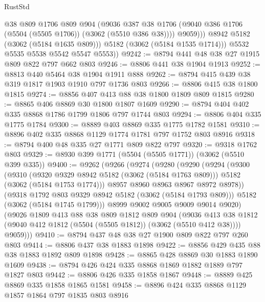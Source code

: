 \begin{lexlean}{RustStd}
\begin{coremodule}
                  @38
                  @809
                  @1706
                  @809
                  @904
                  (@9036
                    @387
                    @38
                    @1706
                    (@9040 @386 @1706 (@5504 (@5505 @1706)) (@3062 (@5510 @386 @38))))
                  @9059)))
            @8942
            @5182
            (@3062 (@5184 @1635 @809)))
          @5182
          (@3062 (@5184 @1535 @1714)))
        @5532
        @5535
        @5538
        @5542
        @5547
        @5553))
@9242 := @8794 @441 @48 @38 @27 @1915 @809 @822 @797 @662 @803
@9246 := @8806 @441 @38 @1904 @1913
@9252 := @8813 @440 @5464 @38 @1904 @1911 @888
@9262 := @8794 @415 @439 @38 @319 @1817 @1903 @1910 @797 @1736 @803
@9266 := @8806 @415 @38 @1800 @1815
@9274 := @8856 @407 @413 @88 @38 @1800 @1809 @809 @1815
@9280 := @8865 @406 @8869 @30 @1800 @1807 @1609
@9290 := @8794 @404 @402 @335 @8868 @1786 @1799 @1806 @797 @1744 @803
@9294 := @8806 @404 @335 @1775 @1784
@9300 := @8889 @403 @8869 @335 @1775 @1782 @1581
@9310 := @8896 @402 @335 @8868 @1129 @1774 @1781 @797 @1752 @803 @8916
@9318 := @8794 @400 @48 @335 @27 @1771 @809 @822 @797
@9320 := @9318 @1762 @803
@9329 := @8930 @399 @1771 (@5504 (@5505 @1771)) (@3062 (@5510 @399 @335))
@9400 := @9262
    (@9266
      (@9274
        (@9280
          (@9290
            (@9294
              (@9300
                (@9310
                  (@9320 @9329 @8942 @5182 (@3062 (@5184 @1763 @809)))
                  @5182
                  (@3062 (@5184 @1753 @1774)))
                @8957
                @8960
                @8963
                @8967
                @8972
                @8978))
            (@9318 @1792 @803 @9329 @8942 @5182 (@3062 (@5184 @1793 @809)))
            @5182
            (@3062 (@5184 @1745 @1799)))
          @8999
          @9002
          @9005
          @9009
          @9014
          @9020)
        (@9026
          @1809
          @413
          @88
          @38
          @809
          @1812
          @809
          @904
          (@9036 @413 @38 @1812 (@9040 @412 @1812 (@5504 (@5505 @1812)) (@3062 (@5510 @412 @38))))
          @9059)))
@9410 := @8794 @437 @48 @38 @27 @1900 @809 @822 @797 @260 @803
@9414 := @8806 @437 @38 @1883 @1898
@9422 := @8856 @429 @435 @88 @38 @1883 @1892 @809 @1898
@9428 := @8865 @428 @8869 @30 @1883 @1890 @1609
@9438 := @8794 @426 @424 @335 @8868 @1869 @1882 @1889 @797 @1827 @803
@9442 := @8806 @426 @335 @1858 @1867
@9448 := @8889 @425 @8869 @335 @1858 @1865 @1581
@9458 := @8896 @424 @335 @8868 @1129 @1857 @1864 @797 @1835 @803 @8916

\end{coremodule}
\end{lexlean}
